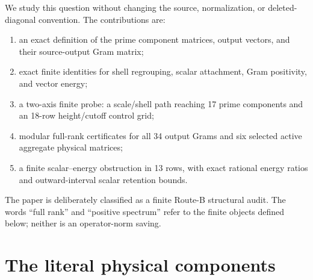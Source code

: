 \documentclass[11pt]{article}
\begin{document}
We study this question without changing the source, normalization, or
deleted-diagonal convention.  The contributions are:

\begin{enumerate}[leftmargin=1.8em,itemsep=2pt]
  \item an exact definition of the prime component matrices, output vectors,
        and their source-output Gram matrix;
  \item exact finite identities for shell regrouping, scalar attachment,
        Gram positivity, and vector energy;
  \item a two-axis finite probe: a scale/shell path reaching 17 prime
        components and an 18-row height/cutoff control grid;
  \item modular full-rank certificates for all 34 output Grams and six
        selected active aggregate physical matrices;
  \item a finite scalar--energy obstruction in 13 rows, with exact rational
        energy ratios and outward-interval scalar retention bounds.
\end{enumerate}

The paper is deliberately classified as a finite Route-B structural audit.
The words ``full rank'' and ``positive spectrum'' refer to the finite objects
defined below; neither is an operator-norm saving.

\section{The literal physical components}
\end{document}
